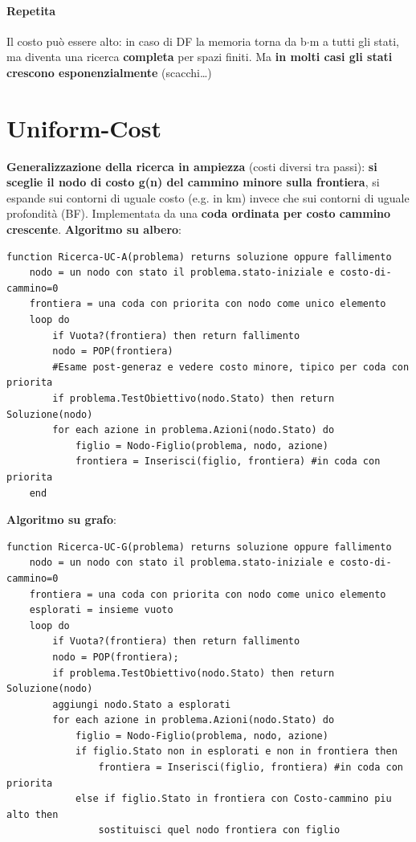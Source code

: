 \documentclass[10pt]{book}
\begin{document}
\paragraph{Repetita} Il costo può essere alto: in caso di DF la memoria torna da b$\cdot$m a tutti gli stati, ma diventa una ricerca \textbf{completa} per spazi finiti. Ma \textbf{in molti casi gli stati crescono esponenzialmente} (scacchi\ldots)
\section{Uniform-Cost} \textbf{Generalizzazione della ricerca in ampiezza} (costi diversi tra passi): \textbf{si sceglie il nodo di costo g(n) del cammino minore sulla frontiera}, si espande sui contorni di uguale costo (e.g. in km) invece che sui contorni di uguale profondità (BF). Implementata da una \textbf{coda ordinata per costo cammino crescente}. \textbf{Algoritmo su albero}:
\begin{lstlisting}
function Ricerca-UC-A(problema) returns soluzione oppure fallimento
	nodo = un nodo con stato il problema.stato-iniziale e costo-di-cammino=0
	frontiera = una coda con priorita con nodo come unico elemento
	loop do
		if Vuota?(frontiera) then return fallimento
		nodo = POP(frontiera)
		#Esame post-generaz e vedere costo minore, tipico per coda con priorita
		if problema.TestObiettivo(nodo.Stato) then return Soluzione(nodo)
		for each azione in problema.Azioni(nodo.Stato) do
			figlio = Nodo-Figlio(problema, nodo, azione)
			frontiera = Inserisci(figlio, frontiera) #in coda con priorita
	end
\end{lstlisting}
\pagebreak
\textbf{Algoritmo su grafo}:
\begin{lstlisting}
function Ricerca-UC-G(problema) returns soluzione oppure fallimento
	nodo = un nodo con stato il problema.stato-iniziale e costo-di-cammino=0
	frontiera = una coda con priorita con nodo come unico elemento
	esplorati = insieme vuoto
	loop do
		if Vuota?(frontiera) then return fallimento
		nodo = POP(frontiera);
		if problema.TestObiettivo(nodo.Stato) then return Soluzione(nodo)
		aggiungi nodo.Stato a esplorati
		for each azione in problema.Azioni(nodo.Stato) do
			figlio = Nodo-Figlio(problema, nodo, azione)
			if figlio.Stato non in esplorati e non in frontiera then
				frontiera = Inserisci(figlio, frontiera) #in coda con priorita
			else if figlio.Stato in frontiera con Costo-cammino piu alto then
				sostituisci quel nodo frontiera con figlio 
\end{lstlisting}
\end{document}
